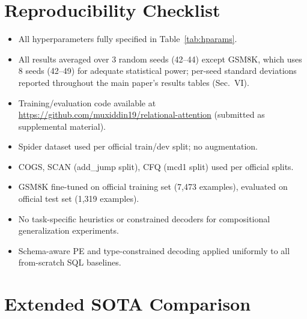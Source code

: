 \documentclass[conference]{IEEEtran}
\begin{document}
\section{Reproducibility Checklist}
\label{app:checklist}

\begin{itemize}[noitemsep,topsep=2pt]
  \item[$\checkmark$] All hyperparameters fully specified in Table~\ref{tab:hparams}.
  \item[$\checkmark$] All results averaged over 3 random seeds (42--44) except GSM8K, which uses 8 seeds (42--49) for adequate statistical power; per-seed standard deviations reported throughout the main paper's results tables (Sec.~VI).
  \item[$\checkmark$] Training/evaluation code available at \url{https://github.com/muxiddin19/relational-attention} (submitted as supplemental material).
  \item[$\checkmark$] Spider dataset used per official train/dev split; no augmentation.
  \item[$\checkmark$] COGS, SCAN (add\_jump split), CFQ (mcd1 split) used per official splits.
  \item[$\checkmark$] GSM8K fine-tuned on official training set (7,473 examples), evaluated on official test set (1,319 examples).
  \item[$\checkmark$] No task-specific heuristics or constrained decoders for compositional generalization experiments.
  \item[$\checkmark$] Schema-aware PE and type-constrained decoding applied uniformly to all from-scratch SQL baselines.
\end{itemize}

\iffalse
\section{Extended SOTA Comparison}
\label{app:sota}
\end{document}
